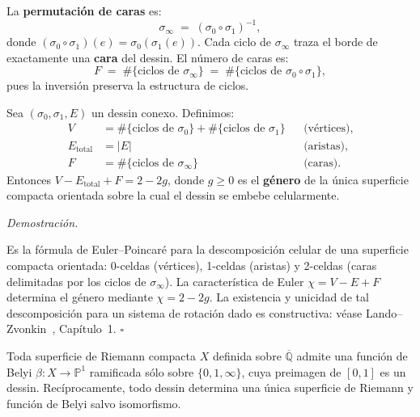 \documentclass[11pt, a4paper, openany]{book}
\renewenvironment{proof}[1][Demostraci\'on]{%
  \par\noindent\textit{#1.}\quad
}{\hfill$\square$\par\medskip}
\begin{document}
\begin{definition}
\label{def:perm-caras}
La \textbf{permutación de caras} es:
\[
  \sigma_\infty \;=\; (\sigma_0 \circ \sigma_1)^{-1},
\]
donde $(\sigma_0 \circ \sigma_1)(e) = \sigma_0(\sigma_1(e))$. Cada
ciclo de $\sigma_\infty$ traza el borde de exactamente una
\textbf{cara} del dessin. El número de caras es:
\[
  F \;=\; \#\{\text{ciclos de } \sigma_\infty\}
    \;=\; \#\{\text{ciclos de } \sigma_0 \circ \sigma_1\},
\]
pues la inversión preserva la estructura de ciclos.
\end{definition}

\begin{theorem}
\label{thm:euler-grothendieck}
Sea $(\sigma_0, \sigma_1, E)$ un dessin conexo. Definimos:
\begin{align*}
  V &= \#\{\text{ciclos de } \sigma_0\}
     + \#\{\text{ciclos de } \sigma_1\}
     && \text{(vértices)}, \\
  E_{\mathrm{total}} &= |E|
     && \text{(aristas)}, \\
  F &= \#\{\text{ciclos de } \sigma_\infty\}
     && \text{(caras)}.
\end{align*}
Entonces $V - E_{\mathrm{total}} + F = 2 - 2g$, donde $g \ge 0$ es el
\textbf{género} de la única superficie compacta orientada sobre la cual
el dessin se embebe celularmente.
\end{theorem}

\begin{proof}
Es la fórmula de Euler--Poincaré para la descomposición celular de una
superficie compacta orientada: 0-celdas (vértices), 1-celdas (aristas)
y 2-celdas (caras delimitadas por los ciclos de $\sigma_\infty$). La
característica de Euler $\chi = V - E + F$ determina el género mediante
$\chi = 2 - 2g$. La existencia y unicidad de tal descomposición para
un sistema de rotación dado es constructiva: véase
Lando--Zvonkin~\cite{lando2004}, Capítulo~1.
\end{proof}

\begin{theorem}
\label{thm:belyi}
Toda superficie de Riemann compacta $X$ definida sobre
$\overline{\mathbb{Q}}$ admite una función de Belyi
$\beta \colon X \to \mathbb{P}^1$ ramificada sólo sobre
$\{0, 1, \infty\}$, cuya preimagen de $[0,1]$ es un dessin.
Recíprocamente, todo dessin determina una única superficie de Riemann y
función de Belyi salvo isomorfismo.
\end{theorem}
\end{document}
